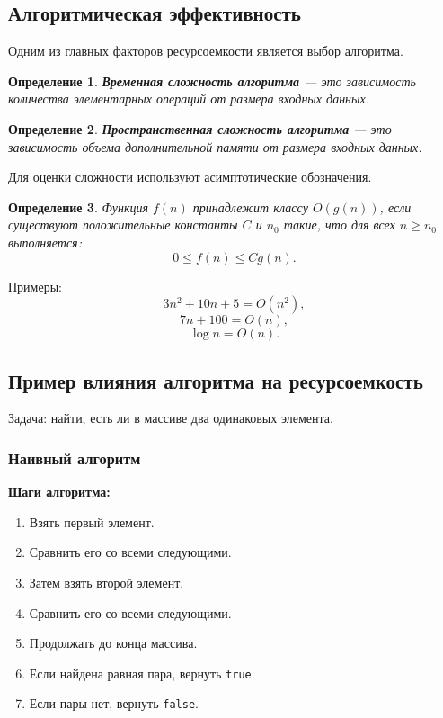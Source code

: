 \documentclass[12pt,a4paper]{article}
\newtheorem{definition}{Определение}
\begin{document}
\subsection{Алгоритмическая эффективность}

Одним из главных факторов ресурсоемкости является выбор алгоритма.

\begin{definition}
\textbf{Временная сложность алгоритма} --- это зависимость количества элементарных операций от размера входных данных.
\end{definition}

\begin{definition}
\textbf{Пространственная сложность алгоритма} --- это зависимость объема дополнительной памяти от размера входных данных.
\end{definition}

Для оценки сложности используют асимптотические обозначения.

\begin{definition}
Функция $f(n)$ принадлежит классу $O(g(n))$, если существуют положительные константы $C$ и $n_0$ такие, что для всех $n \geq n_0$ выполняется:
\[
0 \leq f(n) \leq Cg(n).
\]
\end{definition}

Примеры:
\[
3n^2 + 10n + 5 = O(n^2),
\]
\[
7n + 100 = O(n),
\]
\[
\log n = O(n).
\]

\subsection{Пример влияния алгоритма на ресурсоемкость}

Задача: найти, есть ли в массиве два одинаковых элемента.

\subsubsection{Наивный алгоритм}

\textbf{Шаги алгоритма:}
\begin{enumerate}
    \item Взять первый элемент.
    \item Сравнить его со всеми следующими.
    \item Затем взять второй элемент.
    \item Сравнить его со всеми следующими.
    \item Продолжать до конца массива.
    \item Если найдена равная пара, вернуть \texttt{true}.
    \item Если пары нет, вернуть \texttt{false}.
\end{enumerate}
\end{document}
